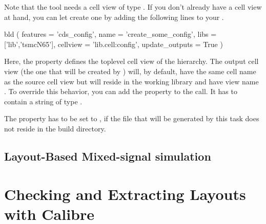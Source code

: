 \warningsign Note that the  tool needs a cell view
of type . If you don't already have a  cell view at hand,
you can let  create one by adding the following lines to your
.
\begin{lstwscript}
bld (                                                                          
    features = 'cds_config',
    name = 'create_some_config',
    libs = ['lib','tsmcN65'],
    cellview = 'lib.cell:config',
    update_outputs = True
)
\end{lstwscript}

Here, the  property defines the toplevel cell view of the
hierarchy. The output cell view (the one that will be created by )
will, by default, have the same cell name as the source cell view but will
reside in the working library and have view name . To
override this behavior, you can add the property  to the
call. It has to contain a string of type .

The  property has to be set to , if the file
that will be generated by this task does not reside in the build directory.

\subsection{Layout-Based Mixed-signal simulation}

%
%
%
%
%
%

\section{Checking and Extracting Layouts with Calibre}

